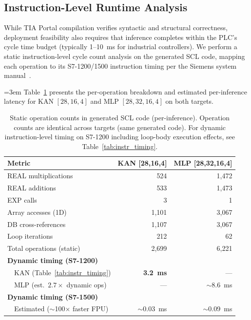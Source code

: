 \documentclass[journal,onecolumn]{IEEEtran}
\begin{document}
\subsection{Instruction-Level Runtime Analysis}
\label{sec:runtime}

While TIA Portal compilation verifies syntactic and structural correctness,
deployment feasibility also requires that inference completes within the PLC's
cycle time budget (typically 1--10~ms for industrial controllers). We perform
a static instruction-level cycle count analysis on the generated SCL code,
mapping each operation to its S7-1200/1500 instruction timing per the Siemens
system manual~\cite{siemens_s7_1200_2022}.

\begingroup{}\emergencystretch=3em
Table~\ref{tab:cycle_count} presents the per-operation breakdown and estimated
per-inference latency for KAN\hspace{0pt} $[28,16,4]$ and MLP $[28,32,16,4]$ on both targets.\par\endgroup

\begin{table}[t]
\centering
\caption{Static operation counts in generated SCL code (per-inference).
        Operation counts are identical across targets (same generated code).
        For dynamic instruction-level timing on S7-1200 including loop-body
        execution effects, see Table~\ref{tab:instr_timing}.}
\label{tab:cycle_count}
\footnotesize
\begin{tabular}{lrr}
\toprule
\textbf{Metric} & \textbf{KAN [28,16,4]} & \textbf{MLP [28,32,16,4]} \\
\midrule
REAL multiplications      & 524  & 1,472 \\
REAL additions            & 533  & 1,473 \\
EXP calls                 & 3    & 1 \\
Array accesses (1D)       & 1,101 & 3,067 \\
DB cross-references       & 1,107 & 3,067 \\
Loop iterations           & 212  & 62 \\
\midrule
Total operations (static) & 2,699 & 6,221 \\
\midrule
\textbf{Dynamic timing (S7-1200)} & & \\
~~KAN (Table~\ref{tab:instr_timing}) & \textbf{3.2~ms} & --- \\
~~MLP (est.\ $2.7\times$ dynamic ops) & --- & $\sim$8.6~ms \\
\textbf{Dynamic timing (S7-1500)} & & \\
~~Estimated ($\sim$100$\times$ faster FPU) & $\sim$0.03~ms & $\sim$0.09~ms \\
\bottomrule
\end{tabular}
\end{table}
\end{document}
